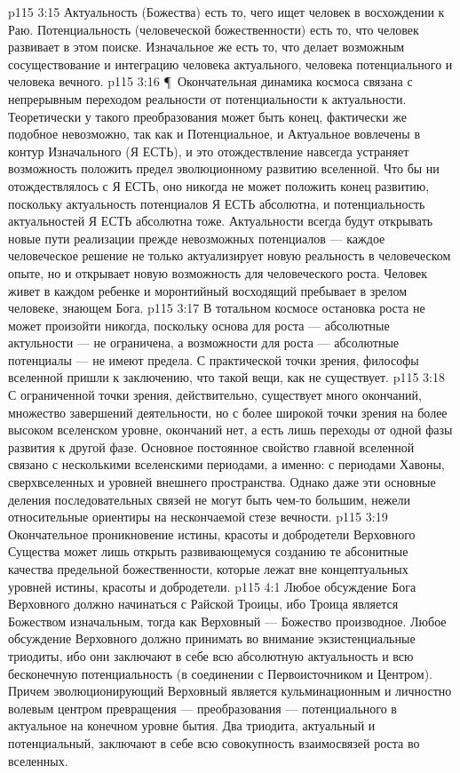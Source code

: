 \vs p115 3:15 Актуальность (Божества) есть то, чего ищет человек в восхождении к Раю. Потенциальность (человеческой божественности) есть то, что человек развивает в этом поиске. Изначальное же есть то, что делает возможным сосуществование и интеграцию человека актуального, человека потенциального и человека вечного.
\vs p115 3:16 \P\ Окончательная динамика космоса связана с непрерывным переходом реальности от потенциальности к актуальности. Теоретически у такого преобразования может быть конец, фактически же подобное невозможно, так как и Потенциальное, и Актуальное вовлечены в контур Изначального (Я ЕСТЬ), и это отождествление навсегда устраняет возможность положить предел эволюционному развитию вселенной. Что бы ни отождествлялось с Я ЕСТЬ, оно никогда не может положить конец развитию, поскольку актуальность потенциалов Я ЕСТЬ абсолютна, и потенциальность актуальностей Я ЕСТЬ абсолютна тоже. Актуальности всегда будут открывать новые пути реализации прежде невозможных потенциалов --- каждое человеческое решение не только актуализирует новую реальность в человеческом опыте, но и открывает новую возможность для человеческого роста. Человек живет в каждом ребенке и моронтийный восходящий пребывает в зрелом человеке, знающем Бога.
\vs p115 3:17 В тотальном космосе остановка роста не может произойти никогда, поскольку основа для роста --- абсолютные актульности --- не ограничена, а возможности для роста --- абсолютные потенциалы --- не имеют предела. С практической точки зрения, философы вселенной пришли к заключению, что такой вещи, как  не существует.
\vs p115 3:18 С ограниченной точки зрения, действительно, существует много окончаний, множество завершений деятельности, но с более широкой точки зрения на более высоком вселенском уровне, окончаний нет, а есть лишь переходы от одной фазы развития к другой фазе. Основное постоянное свойство главной вселенной связано с несколькими вселенскими периодами, а именно: с периодами Хавоны, сверхвселенных и уровней внешнего пространства. Однако даже эти основные деления последовательных связей не могут быть чем\hyp{}то большим, нежели относительные ориентиры на нескончаемой стезе вечности.
\vs p115 3:19 Окончательное проникновение истины, красоты и добродетели Верховного Существа может лишь открыть развивающемуся созданию те абсонитные качества предельной божественности, которые лежат вне концептуальных уровней истины, красоты и добродетели.
\vs p115 4:1 Любое обсуждение  Бога Верховного должно начинаться с Райской Троицы, ибо Троица является Божеством изначальным, тогда как Верховный --- Божество производное. Любое обсуждение  Верховного должно принимать во внимание экзистенциальные триодиты, ибо они заключают в себе всю абсолютную актуальность и всю бесконечную потенциальность (в соединении с Первоисточником и Центром). Причем эволюционирующий Верховный является кульминационным и личностно волевым центром превращения --- преобразования --- потенциального в актуальное на конечном уровне бытия. Два триодита, актуальный и потенциальный, заключают в себе всю совокупность взаимосвязей роста во вселенных.
